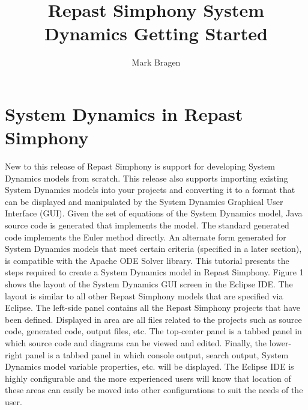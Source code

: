 \documentclass[11pt]{amsart}
\title{Repast Simphony System Dynamics Getting Started}
\author{Mark Bragen}
\begin{document}
 
\maketitle

\section{System Dynamics in Repast Simphony}
New to this release of Repast Simphony is support for developing System Dynamics models from scratch. This release also supports importing existing System Dynamics models into your projects and converting it to a format that can be displayed and manipulated by the System Dynamics Graphical User Interface (GUI). Given the set of equations of the System Dynamics model, Java source code is generated that implements the model. The standard generated code implements the Euler method directly. An alternate form generated for System Dynamics models that meet certain criteria (specified in a later section), is compatible with the Apache ODE Solver library.
This tutorial presents the steps required to create a System Dynamics model in Repast Simphony.
Figure 1 shows the layout of the System Dynamics GUI screen in the Eclipse IDE. The layout is similar to all other Repast Simphony models that are specified via Eclipse. The left-side panel contains all the Repast Simphony projects that have been defined. Displayed in area are all files related to the projects such as source code, generated code, output files, etc. The top-center panel is a tabbed panel in which source code and diagrams can be viewed and edited. Finally, the lower-right panel is a tabbed panel in which console output, search output, System Dynamics model variable properties, etc. will be displayed. The Eclipse IDE is highly configurable and the more experienced users will know that location of these areas can easily be moved into other configurations to suit the needs of the user.\\
\end{document}
